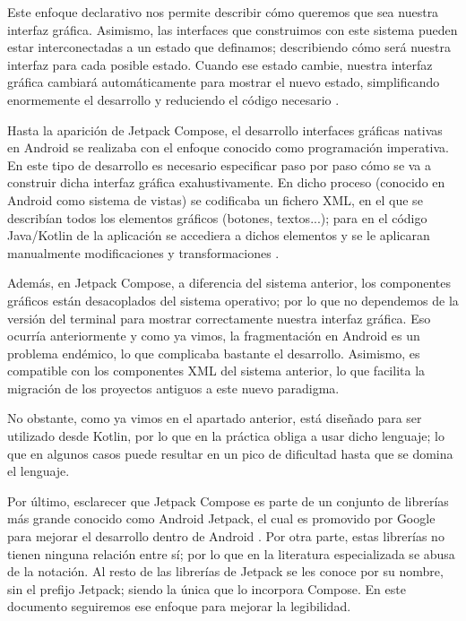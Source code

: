             Este enfoque declarativo nos permite describir cómo queremos que sea nuestra interfaz gráfica. 
            Asimismo, las interfaces que construimos con este sistema pueden estar interconectadas a un estado 
            que definamos; describiendo cómo será nuestra interfaz para cada posible estado. Cuando ese estado cambie, 
            nuestra interfaz gráfica cambiará automáticamente para mostrar el nuevo estado, simplificando enormemente 
            el desarrollo y reduciendo el código necesario \cite{leiva_que_2021}. 

            Hasta la aparición de Jetpack Compose, el desarrollo interfaces gráficas nativas en Android se realizaba 
            con el enfoque conocido como programación imperativa. En este tipo de desarrollo es necesario especificar 
            paso por paso cómo se va a construir dicha interfaz gráfica exahustivamente. En dicho proceso (conocido 
            en Android como sistema de vistas) se codificaba un fichero XML, en el que se describían todos los 
            elementos gráficos (botones, textos...); para en el código Java/Kotlin de la aplicación se accediera 
            a dichos elementos y se le aplicaran manualmente modificaciones y transformaciones 
            \cite{noauthor_programacion_2021}. 

            Además, en Jetpack Compose, a diferencia del sistema anterior, los componentes gráficos están desacoplados 
            del sistema operativo; por lo que no dependemos de la versión del terminal para mostrar correctamente 
            nuestra interfaz gráfica. Eso ocurría anteriormente y como ya vimos, la fragmentación en Android es un 
            problema endémico, lo que complicaba bastante el desarrollo. Asimismo, es compatible con los componentes XML 
            del sistema anterior, lo que facilita la migración de los proyectos antiguos a este nuevo paradigma. 

            No obstante, como ya vimos en el apartado anterior, está diseñado para ser utilizado desde Kotlin, por lo 
            que en la práctica obliga a usar dicho lenguaje; lo que en algunos casos puede resultar en un pico de 
            dificultad hasta que se domina el lenguaje.

            Por último, esclarecer que Jetpack Compose es parte de un conjunto de librerías más grande conocido como 
            Android Jetpack, el cual es promovido por Google para mejorar el desarrollo dentro de Android 
            \cite{huaman_que_2018} \cite{noauthor_recursos_nodate}. Por otra
            parte, estas librerías no tienen ninguna relación entre sí; por lo que en la literatura especializada se 
            abusa de la notación. Al resto de las librerías de Jetpack se les conoce
            por su nombre, sin el prefijo Jetpack; siendo la única que lo incorpora Compose. En este documento 
            seguiremos ese enfoque para mejorar la legibilidad.
        
